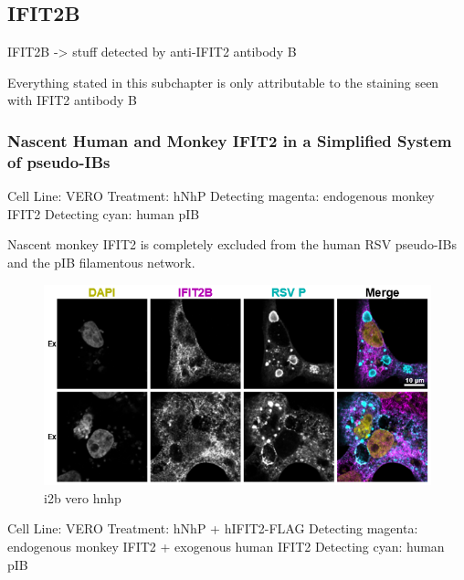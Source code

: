 \subsection{IFIT2B}
IFIT2B -> stuff detected by anti-IFIT2 antibody B

Everything stated in this subchapter is only attributable to the staining seen with IFIT2 antibody B
\subsubsection{Nascent Human and Monkey IFIT2 in a Simplified System of pseudo-IBs} \label{Nascent Human and Monkey IFIT2 in a Simplified System of pseudo-IBs}
Cell Line: VERO \newline
Treatment: hNhP \newline
Detecting magenta: endogenous monkey IFIT2 \newline
Detecting cyan: human pIB \newline

Nascent monkey IFIT2 is completely excluded from the human RSV pseudo-IBs and the pIB filamentous network.

\begin{figure}
    \centering
    \includegraphics[width=1\linewidth]{09. Chapter 4//Figs//02. I2B/01. i2b vero hnhp.png}
    \caption[i2b vero hnhp]{i2b vero hnhp}
    \label{i2b vero hnhp}
\end{figure}

Cell Line: VERO \newline
Treatment: hNhP + hIFIT2-FLAG \newline
Detecting magenta: endogenous monkey IFIT2 + exogenous human IFIT2 \newline
Detecting cyan: human pIB \newline

